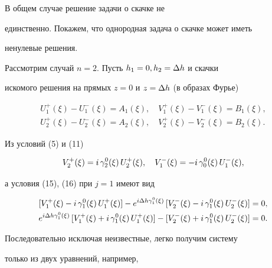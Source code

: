 \begin{note}


В общем случае решение задачи о скачке не


единственно. Покажем, что однородная задача о скачке может иметь


ненулевые решения.


\end{note}





Рассмотрим случай $n=2$. Пусть $h_1=0, h_2=\Delta h$ и скачки


искомого решения на прямых $z=0$ и $z=\Delta h$ (в образах Фурье)


\begin{gather*}


U^+_1(\xi)-U^-_1(\xi)=A_1(\xi), \quad


V^+_1(\xi)-V^-_1(\xi)=B_1(\xi), \\


%


U^+_2(\xi)-U^-_2(\xi)=A_2(\xi), \quad


V^+_2(\xi)-V^-_2(\xi)=B_2(\xi) . 


\end{gather*}


Из условий (5) и (11)


$$


V^+_2(\xi)=i\,\gaoxi{2}\,U^+_2(\xi),\quad


 V^-_1(\xi)=-i\,\gaoxi{0}\,U^-_1(\xi) ,


$$


а условия (15), (16) при $j=1$ имеют вид


\begin{align*}


[V^+_1(\xi)-i\,\gaoxi{1}\,U^+_1(\xi)]


 -e^{i\De h\gaoxi{1}}\,[V^-_2(\xi)-i\,\gaoxi{1}\,U^-_2(\xi)] &= 0 , \\


%


e^{i\De h\gaoxi{1}}\,[V^+_1(\xi)+i\,\gaoxi{1}\,U^+_1(\xi)]


 - [V^-_2(\xi)+i\,\gaoxi{1}\,U^-_2(\xi)] &= 0 . 


\end{align*}


Последовательно исключая неизвестные, легко получим систему


только из двух уравнений, например,


